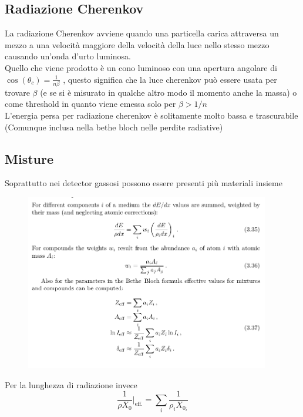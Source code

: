 \subsection{Radiazione Cherenkov}
La radiazione Cherenkov avviene quando una particella carica attraversa un mezzo a una velocità maggiore della velocità della luce nello stesso mezzo causando un'onda d'urto luminosa.
\\
Quello che viene prodotto è un cono luminoso con una apertura angolare di $\cos(\theta_c)=\frac{1}{n\beta}$ , questo significa che la luce cherenkov può essere usata per trovare $\beta$ (e se si è misurato in qualche altro modo il momento anche la massa) o come threshold in quanto viene emessa solo per $\beta>1/n$
\\
L'energia persa per radiazione cherenkov è solitamente molto bassa e trascurabile (Comunque inclusa nella bethe bloch nelle perdite radiative)
\subsection{Misture}
Soprattutto nei detector gassosi possono essere presenti più materiali insieme
\begin{figure}[H]
    \centering
    \includegraphics[width=0.95\textwidth,frame]{Chapters/images/Interazione_radiazione_materia/image-20220217042603821.png}
    \captionsetup{width=0.95\linewidth}
    \label{fig:misture}
\end{figure}
Per la lunghezza di radiazione invece \[\frac{1}{\rho X_0}|_{\text{eff.}}=\sum_i \frac{1}{\rho_i X_{0_i}}\]

